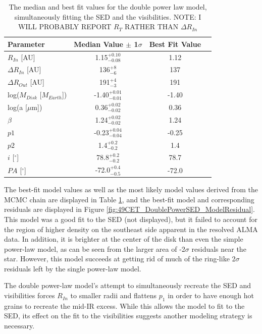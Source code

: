 {{\begin{table}
\begin{center}
    \def\arraystretch{1.37}%
    \begin{tabular}{l*{2}{c}r}
    \hline
    Parameter & Median Value $\pm$ 1$\sigma$ & Best Fit Value \\ \hline
     $R_{In}$  [AU] & 1.15$^{+0.10}_{-0.08}$ & 1.12\\  
     $\Delta R_{In}$ [AU] & 136$^{+8}_{-6}$ & 137\\ 
     $\Delta R_{Out}$ [AU] & 191$^{+4}_{-3}$ & 191\\ 
     log($M_{Disk}$ [$M_{Earth}$]) & -1.40$^{+0.01}_{-0.01}$ & -1.40 \\
     log(a [$\mu$m]) & 0.36$^{+0.02}_{-0.02}$ & 0.36\\ 
     $\beta$ & 1.24$^{+0.02}_{-0.02}$ & 1.24\\ 
     $p1$ & -0.23$^{+0.04}_{-0.04}$ & -0.25\\ 
     $p2$ & 1.4$^{+0.2}_{-0.2}$ & 1.4\\ 
     $i$ [$^\circ$] & 78.8$^{+0.2}_{-0.2}$ & 78.7 \\ 
     $PA$ [$^\circ$] & -72.0$^{+0.4}_{-0.5}$ & -72.0\\
    \hline
    \end{tabular}
\end{center}
\caption{The median and best fit values for the double power law model, simultaneously fitting the SED and the visibilities. NOTE: I WILL PROBABLY REPORT $R_{T}$ RATHER THAN $\Delta R_{In}$} 
\label{tab:doublePowerSEDTable}
\end{table}

The best-fit model values as well as the most likely model values derived from the MCMC chain are displayed in Table \ref{tab:doublePowerSEDTable}, and the best-fit model and corresponding residuals are displayed in Figure \ref{fig:49CET_DoublePowerSED_ModelResidual}. This model was a good fit to the SED (not displayed), but it failed to account for the region of higher density on the southeast side apparent in the resolved ALMA data. In addition, it is brighter at the center of the disk than even the simple power-law model, as can be seen from the larger area of -2$\sigma$ residuals near the star. However, this model succeeds at getting rid of much of the ring-like 2$\sigma$ residuals left by the single power-law model.

The double power-law model's attempt to simultaneously recreate the SED and visibilities forces $R_{In}$ to smaller radii and flattens $p_{1}$ in order to have enough hot grains to recreate the mid-IR excess. While this allows the model to fit to the SED, its effect on the fit to the visibilities suggests another modeling strategy is necessary.


}}
